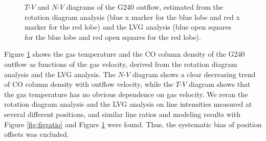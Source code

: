 \begin{figure}[!tbp]
\caption{$T$-$V$ and $N$-$V$ diagrams of the G240 outflow, estimated from the rotation diagram analysis (blue x marker for the blue lobe and red x marker for the red lobe) and the LVG analysis (blue open squares for the blue lobe and red open squares for the red lobe). \label{fig:figrelation}}
\end{figure}

Figure \ref{fig:figrelation} shows the gas temperature and the CO column density of the G240 outflow as functions of the gas velocity, derived from the rotation diagram analysis and the LVG analysis. The $N$-$V$ diagram shows a clear decreasing trend of CO column density with outflow velocity, while the $T$-$V$ diagram shows that the gas temperature has no obvious dependence on gas velocity. We reran the rotation diagram analysis and the LVG analysis on line intensities measured at several different positions, and similar line ratios and modeling results with Figure \ref{fig:figratio} and Figure \ref{fig:figrelation} were found. Thus, the systematic bias of position offsets was excluded.




